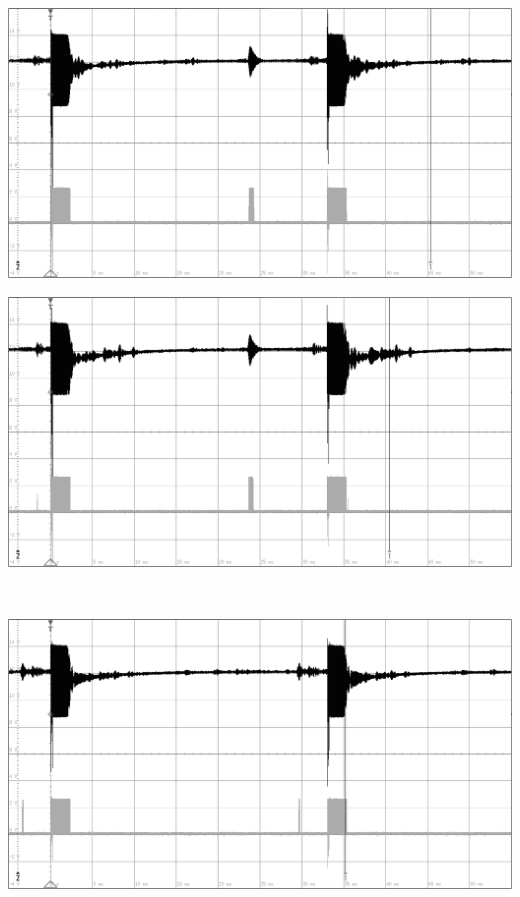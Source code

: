 \begin{minipage}{0.46\textwidth}
\includegraphics[width=1\textwidth%
]{Abbildungen/MessungenP2/15V/4m.PNG}
\end{minipage}\qquad
\begin{minipage}{0.46\textwidth}
\includegraphics[width=1\textwidth%
]{Abbildungen/MessungenP2/20V/4m.PNG}
\end{minipage}\\
\begin{minipage}{0.46\textwidth}
\includegraphics[width=1\textwidth%
]{Abbildungen/MessungenP2/15V/5m.PNG}
\end{minipage}\qquad
